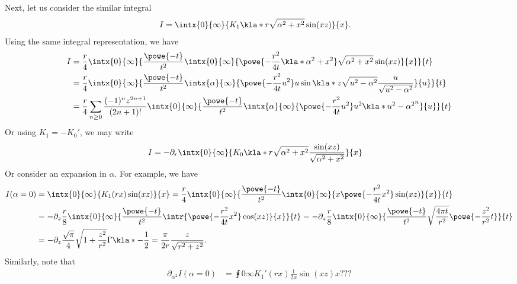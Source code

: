 \documentclass[english, parskip=full]{scrartcl}
\begin{document}
Next, let us consider the similar integral
\begin{align}
I &= \intx{0}{\infty}{K_1\kla*{r\sqrt{\alpha^2 + x^2}} \sin(xz)}{x}.
\end{align}
Using the same integral representation, we have%
\begin{align}
I &= \frac{r}{4} \intx{0}{\infty}{ \frac{\powe{-t}}{t^2} \intx{0}{\infty}{ \powe{-\frac{r^2}{4t} \kla*{\alpha^2 + x^2}} \sqrt{\alpha^2 + x^2} \sin(xz)}{x}}{t} \\
&= \frac{r}{4} \intx{0}{\infty}{ \frac{\powe{-t}}{t^2} \intx{\alpha}{\infty}{ \powe{-\frac{r^2}{4t} u^2} u  \sin\kla*{z \sqrt{u^2-\alpha^2} } \frac{u}{\sqrt{u^2-\alpha^2}} }{u}}{t}\\
&= \frac{r}{4} \sum_{n\ge 0} \frac{(-1)^n z^{2n+1}}{(2n+1)!} \intx{0}{\infty}{ \frac{\powe{-t}}{t^2} \intx{\alpha}{\infty}{ \powe{-\frac{r^2}{4t} u^2} u^2 \kla*{u^2-\alpha^2}^n }{u}}{t}
\end{align}
Or using $K_1 = -K_0'$, we may write%
\begin{align}
I &= -\partial_r \intx{0}{\infty}{K_0\kla*{r\sqrt{\alpha^2 + x^2}} \frac{\sin(xz)}{\sqrt{\alpha^2 + x^2}}}{x}
\end{align}
Or consider an expansion in $\alpha$.
For example, we have
\begin{align}
I(\alpha=0) &= \intx{0}{\infty}{K_1(rx) \sin(xz)}{x} = \frac{r}{4} \intx{0}{\infty}{ \frac{\powe{-t}}{t^2} \intx{0}{\infty}{ x \powe{-\frac{r^2}{4t}x^2} \sin(xz) }{x} }{t}\\
&= - \partial_z \frac{r}{8} \intx{0}{\infty}{ \frac{\powe{-t}}{t^2} \intr{ \powe{-\frac{r^2}{4t}x^2} \cos(xz) }{x} }{t} = -\partial_z\frac{r}{8} \intx{0}{\infty}{\frac{\powe{-t}}{t^2} \sqrt{\frac{4\pi t}{r^2}} \powe{- \frac{z^2}{r^2} t} }{t}\\
&= -\partial_z\frac{\sqrt{\pi}}{4} \sqrt{1 + \frac{z^2}{r^2}} \Gamma\kla*{-\frac{1}{2}} = \frac{\pi}{2r} \frac{z}{\sqrt{r^2+z^2}}.
\end{align}
Similarly, note that
\begin{align}
\partial_{\alpha^2}I(\alpha=0) &= \intx{0}{\infty}{ K_1'(rx) \frac{1}{2x} \sin(xz) }{x}???
\end{align}
\end{document}
